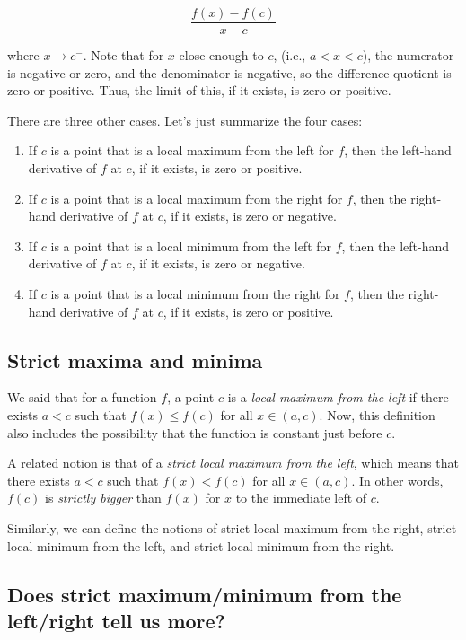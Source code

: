 \documentclass[10pt]{amsart}
\begin{document}
$$\frac{f(x) - f(c)}{x - c}$$

where $x \to c^-$. Note that for $x$ close enough to $c$, (i.e., $a <
x < c$), the numerator is negative or zero, and the denominator is
negative, so the difference quotient is zero or positive. Thus, the
limit of this, if it exists, is zero or positive.

There are three other cases. Let's just summarize the four cases:

\begin{enumerate}
\item If $c$ is a point that is a local maximum from the left for $f$,
  then the left-hand derivative of $f$ at $c$, if it exists, is zero
  or positive.
\item If $c$ is a point that is a local maximum from the right for
  $f$, then the right-hand derivative of $f$ at $c$, if it exists, is
  zero or negative.
\item If $c$ is a point that is a local minimum from the left for $f$,
  then the left-hand derivative of $f$ at $c$, if it exists, is zero
  or negative.
\item If $c$ is a point that is a local minimum from the right for
  $f$, then the right-hand derivative of $f$ at $c$, if it exists, is
  zero or positive.
\end{enumerate}

\subsection{Strict maxima and minima}

We said that for a function $f$, a point $c$ is a {\em local maximum
from the left} if there exists $a < c$ such that $f(x) \le f(c)$ for
all $x \in (a,c)$. Now, this definition also includes the possibility
that the function is constant just before $c$.

A related notion is that of a {\em strict local maximum from the
left}, which means that there exists $a < c$ such that $f(x) < f(c)$
for all $x \in (a,c)$. In other words, $f(c)$ is {\em strictly bigger}
than $f(x)$ for $x$ to the immediate left of $c$.

Similarly, we can define the notions of strict local maximum from the
right, strict local minimum from the left, and strict local minimum
from the right.

\subsection{Does strict maximum/minimum from the left/right tell us more?}
\end{document}
